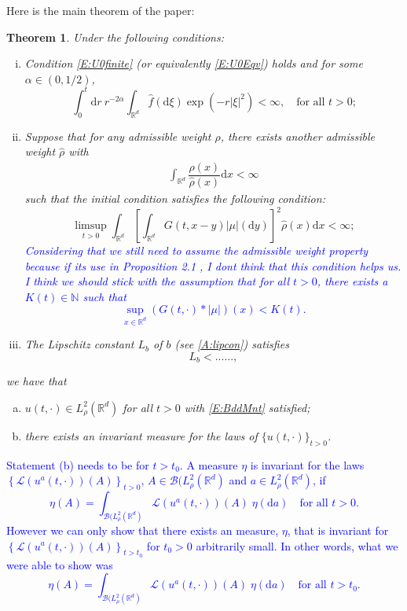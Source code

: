 \documentclass[a4paper,11pt]{article}%
\numberwithin{equation}{section}
\theoremstyle{plain}
\newtheorem{theorem}{Theorem}[section]
\theoremstyle{definition}
\newcommand{\R}{\mathbb{R}}
\newcommand{\ud}{\ensuremath{ \mathrm{d} }}
\begin{document}
Here is the main theorem of the paper:

\begin{theorem}
	\label{T:Main}
	Under the following conditions:
	\begin{enumerate}[(i)]
		\item  Condition \eqref{E:U0finite} (or equivalently \eqref{E:U0Eqv}) holds and for some
			$\alpha\in (0,1/2)$,
			\begin{equation}
				\label{A:fcon}
				\int_0^t \ud r \: r^{-2\alpha} \int_{\R^{d}} \widehat{f}(\ud \xi) \exp\left(-r|\xi|^2 \right) < \infty,
				\quad \text{for all $t>0$;}
			\end{equation}
		\item Suppose that for any admissible weight $\rho$, there exists another admissible weight
			$\widehat{\rho}$ with
			\begin{align}
				\label{E:rhorho}
				\int_{\R^d}\dfrac{\rho(x)}{\widehat{\rho}(x)}\ud x < \infty
			\end{align}
			such that the initial condition satisfies the following condition:
			\begin{equation}
				\label{E:InitData}
				\limsup_{t>0} \int_{\R^d} \left[\int_{\R^d} G(t,x-y)|\mu|(\ud y)\right]^2 \widehat{\rho}(x) \ud x <\infty;
			\end{equation}
\textcolor{blue}{Considering that we still need to assume the admissible weight property because if its use in Proposition 2.1 \cite{TZ98}, I dont think that this condition helps us. I think we should stick with the assumption that for all $t>0$, there exists a $K(t) \in \mathbb{N}$ such that
	\[
		\sup_{x\in \R^d} (G(t,\cdot)*|\mu|)(x) < K(t).
	\]}
		\item The Lipschitz constant $L_b$ of $b$ (see \eqref{A:lipcon}) satisfies
			\begin{equation}
				\label{E:LipLb}
			  L_b < ......,
			\end{equation}
	\end{enumerate}
	we have that
	\begin{enumerate}[(a)]
		\item $u(t,\cdot)\in L_\rho^2(\R^d)$ for all $t>0$ with \eqref{E:BddMnt} satisfied;
		\item there exists an invariant measure for the laws of $\{u(t,\cdot)\}_{t>0}$.
	\end{enumerate}
\end{theorem}

	\textcolor{blue}{Statement (b) needs to be for $t> t_0$. A measure $\eta$ is invariant for the laws $\left\{ \mathcal{L}(u^a(t,\cdot))(A) \right\}_{t > 0}$, $A \in \mathscr{B}(L^2_\rho(\R^d)$ and $a \in L^2_\rho(\R^d)$, if 
		\[
			\eta(A) = \int_{\mathscr{B}(L^2_\rho(\R^d)} \mathcal{L}(u^a(t,\cdot))(A) \; \eta(\ud a) \quad \text{for all } t>0.
		\]
However we can only show that there exists an measure, $\eta$, that is invariant for $\left\{ \mathcal{L}(u^a(t,\cdot))(A) \right\}_{t > t_0}$ for $t_0>0$ arbitrarily small. In other words, what we were able to show was 
	\[
	\eta(A) = \int_{\mathscr{B}(L^2_\rho(\R^d)} \mathcal{L}(u^a(t,\cdot))(A) \; \eta(\ud a) \quad \text{for all } t>t_0.
	\]
}
\newpage
\end{document}
